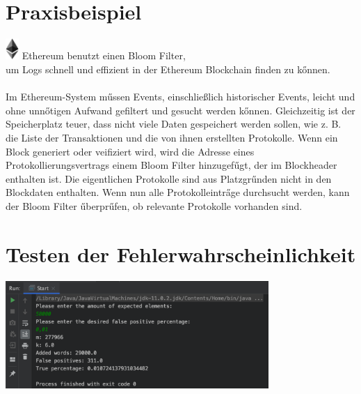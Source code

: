 \documentclass[11pt, a4paper]{article}
\begin{document}
\section{Praxisbeispiel}
\includegraphics[height=8mm]{image/Ethereum.png}
Ethereum benutzt einen Bloom Filter,\\ um Logs schnell und effizient in der Ethereum Blockchain finden zu k{\H o}nnen. \\
\\
Im Ethereum-System m{\H u}ssen Events, einschließlich historischer Events, leicht und ohne unn{\H o}tigen Aufwand gefiltert und gesucht werden k{\H o}nnen. Gleichzeitig ist der Speicherplatz teuer, dass nicht viele Daten gespeichert werden sollen, wie z. B. die Liste der Transaktionen und die von ihnen erstellten Protokolle.
Wenn ein Block generiert oder veifiziert wird, wird die Adresse eines Protokollierungsvertrags einem Bloom Filter hinzugef{\H u}gt, der im Blockheader enthalten ist. Die eigentlichen Protokolle sind aus Platzgr{\H u}nden nicht in den Blockdaten enthalten.
Wenn nun alle Protokolleintr{\H a}ge durchsucht werden, kann der Bloom Filter {\H u}berpr{\H u}fen, ob relevante Protokolle vorhanden sind.

\section{Testen der Fehlerwahrscheinlichkeit}


\includegraphics[width=10cm]{image/Result.png}
\end{document}
